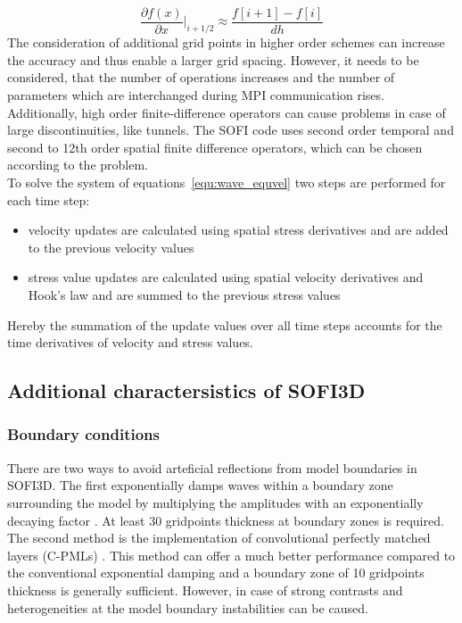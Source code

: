 \begin{equation}
 \frac{\partial f(x)}{\partial x}|_{i+1/2}\approx \frac{f[i+1]-f[i]}{dh}
\end{equation}
 The consideration of additional grid points in higher order schemes can increase the accuracy and thus enable a larger grid spacing. However, it needs to be considered, that the number of operations increases and the number of parameters which are interchanged during MPI communication rises. Additionally, high order finite-difference operators can cause problems in case of large discontinuities, like tunnels. The SOFI code uses second order temporal and second to 12th order spatial finite difference operators, which can be chosen according to the problem.\\
To solve the system of equations~\ref{equ:wave_equvel} two steps are performed for each time step: 
\begin{itemize}
 \item velocity updates are calculated using spatial stress derivatives and are added to the previous velocity values
\item stress value updates are calculated using spatial velocity derivatives and Hook's law and are summed to the previous stress values
\end{itemize}
Hereby the summation of the update values over all time steps accounts for the time derivatives of velocity and stress values. 
\subsection{Additional charactersistics of SOFI3D}\label{sec:SOFI3Dcharacter}
\subsubsection*{Boundary conditions}
There are two ways to avoid arteficial reflections from model boundaries in SOFI3D. The first exponentially damps waves within a boundary zone surrounding the model by multiplying the amplitudes with an exponentially decaying factor \citep{Cer85}. At least 30 gridpoints thickness at boundary zones is required. The second method is the implementation of convolutional perfectly matched layers (C-PMLs) \citep{Ber94,Kom07}. This method can offer a much better performance compared to the  conventional exponential damping and a boundary zone of 10 gridpoints thickness is generally sufficient. However, in case of strong contrasts and heterogeneities at the model boundary instabilities can be caused.

